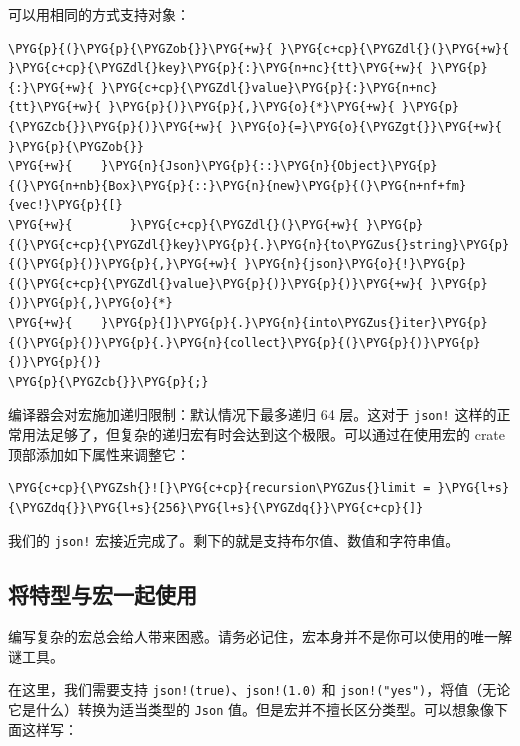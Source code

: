 可以用相同的方式支持对象：

\begin{Verbatim}[commandchars=\\\{\},breaklines=true,breakanywhere=true,fontsize=\codefont,xleftmargin=17bp]
\PYG{p}{(}\PYG{p}{\PYGZob{}}\PYG{+w}{ }\PYG{c+cp}{\PYGZdl{}(}\PYG{+w}{ }\PYG{c+cp}{\PYGZdl{}key}\PYG{p}{:}\PYG{n+nc}{tt}\PYG{+w}{ }\PYG{p}{:}\PYG{+w}{ }\PYG{c+cp}{\PYGZdl{}value}\PYG{p}{:}\PYG{n+nc}{tt}\PYG{+w}{ }\PYG{p}{)}\PYG{p}{,}\PYG{o}{*}\PYG{+w}{ }\PYG{p}{\PYGZcb{}}\PYG{p}{)}\PYG{+w}{ }\PYG{o}{=}\PYG{o}{\PYGZgt{}}\PYG{+w}{ }\PYG{p}{\PYGZob{}}
\PYG{+w}{    }\PYG{n}{Json}\PYG{p}{::}\PYG{n}{Object}\PYG{p}{(}\PYG{n+nb}{Box}\PYG{p}{::}\PYG{n}{new}\PYG{p}{(}\PYG{n+nf+fm}{vec!}\PYG{p}{[}
\PYG{+w}{        }\PYG{c+cp}{\PYGZdl{}(}\PYG{+w}{ }\PYG{p}{(}\PYG{c+cp}{\PYGZdl{}key}\PYG{p}{.}\PYG{n}{to\PYGZus{}string}\PYG{p}{(}\PYG{p}{)}\PYG{p}{,}\PYG{+w}{ }\PYG{n}{json}\PYG{o}{!}\PYG{p}{(}\PYG{c+cp}{\PYGZdl{}value}\PYG{p}{)}\PYG{p}{)}\PYG{+w}{ }\PYG{p}{)}\PYG{p}{,}\PYG{o}{*}
\PYG{+w}{    }\PYG{p}{]}\PYG{p}{.}\PYG{n}{into\PYGZus{}iter}\PYG{p}{(}\PYG{p}{)}\PYG{p}{.}\PYG{n}{collect}\PYG{p}{(}\PYG{p}{)}\PYG{p}{)}\PYG{p}{)}
\PYG{p}{\PYGZcb{}}\PYG{p}{;}
\end{Verbatim}

编译器会对宏施加递归限制：默认情况下最多递归 64 层。这对于 \texttt{json!} 这样的正常用法足够了，但复杂的递归宏有时会达到这个极限。可以通过在使用宏的 crate 顶部添加如下属性来调整它：

\begin{Verbatim}[commandchars=\\\{\},breaklines=true,breakanywhere=true,fontsize=\codefont,xleftmargin=17bp]
\PYG{c+cp}{\PYGZsh{}![}\PYG{c+cp}{recursion\PYGZus{}limit = }\PYG{l+s}{\PYGZdq{}}\PYG{l+s}{256}\PYG{l+s}{\PYGZdq{}}\PYG{c+cp}{]}
\end{Verbatim}

我们的 \texttt{json!} 宏接近完成了。剩下的就是支持布尔值、数值和字符串值。

\subsection{将特型与宏一起使用}

编写复杂的宏总会给人带来困惑。请务必记住，宏本身并不是你可以使用的唯一解谜工具。

在这里，我们需要支持 \texttt{json!(true)}、\texttt{json!(1.0)} 和 \texttt{json!("yes")}，将值（无论它是什么）转换为适当类型的 \texttt{Json} 值。但是宏并不擅长区分类型。可以想象像下面这样写：

